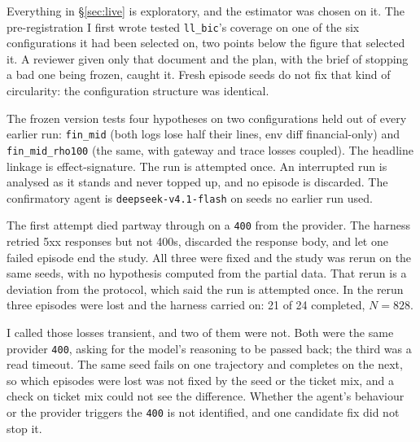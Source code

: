 \documentclass[11pt]{article}
\begin{document}
Everything in \S\ref{sec:live} is exploratory, and the estimator was chosen on it.
The pre-registration I first wrote tested \texttt{ll\_bic}'s coverage on one of the
six configurations it had been selected on, two points below the figure that
selected it. A reviewer given only that document and the plan, with the brief of
stopping a bad one being frozen, caught it. Fresh episode seeds do not fix that
kind of circularity: the configuration structure was identical.

The frozen version tests four hypotheses on two configurations held out of every
earlier run: \texttt{fin\_mid} (both logs lose half their lines, env diff
financial-only) and \texttt{fin\_mid\_rho100} (the same, with gateway and trace
losses coupled). The headline linkage is effect-signature. The run is attempted
once. An interrupted run is analysed as it stands and never topped up, and no
episode is discarded. The confirmatory agent is \texttt{deepseek-v4.1-flash} on
seeds no earlier run used.

The first attempt died partway through on a \texttt{400} from the provider. The
harness retried 5xx responses but not 400s, discarded the response body, and let
one failed episode end the study. All three were fixed and the study was rerun on
the same seeds, with no hypothesis computed from the partial data. That rerun is
a deviation from the protocol, which said the run is attempted once. In the
rerun three episodes were lost and the harness carried on: 21 of 24 completed,
$N = 828$.

I called those losses transient, and two of them were not. Both were the same
provider \texttt{400}, asking for the model's reasoning to be passed back; the
third was a read timeout. The same seed fails on one trajectory and completes on
the next, so which episodes were lost was not fixed by the seed or the ticket
mix, and a check on ticket mix could not see the difference. Whether the agent's
behaviour or the provider triggers the \texttt{400} is not identified, and one
candidate fix did not stop it.

\begin{table}[h]
\centering
\small

\caption{The four pre-registered hypotheses.}
\label{tab:hypotheses}
\end{table}

\begin{table}[h]
\centering

\caption{Confirmatory run, effect-signature linkage.}
\label{tab:confirm}
\end{table}
\end{document}
